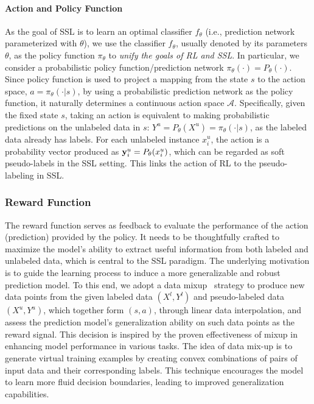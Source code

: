 \paragraph{Action and Policy Function}
As the goal of SSL is to learn an optimal classifier $f_\theta$ (i.e., prediction network parameterized with $\theta$), 
we use the classifier $f_\theta$, usually denoted by its parameters $\theta$, as the policy function $\pi_\theta$
to {\em unify the goals of RL and SSL}. 
In particular, we consider a probabilistic policy function/prediction network 
$\pi_\theta(\cdot)=P_\theta(\cdot)$. 
Since policy function is used to project a mapping from the state $s$ to the action space, 
$a=\pi_\theta(\cdot|s)$, 
by using a probabilistic prediction network as the policy function, 
it naturally determines a continuous action space $\mathcal{A}$.
Specifically, given the fixed state $s$, taking an action
is equivalent to making probabilistic predictions on the unlabeled data in $s$:
$Y^u=P_\theta(X^u)=\pi_\theta(\cdot|s)$, as the labeled data already has labels.  
For each unlabeled instance $x_i^u$, 
the action is a probability vector produced as ${\bf y}_i^u=P_\theta(x_i^u)$,
which can be regarded as soft pseudo-labels in the SSL setting.
This links the action of RL to the pseudo-labeling in SSL. 
\subsubsection{Reward Function}
The reward function serves as feedback to evaluate the performance of the action (prediction) provided by the policy. It needs to be thoughtfully crafted to maximize the model's ability to extract useful information from both labeled and unlabeled data, which is central to the SSL paradigm. 
The underlying motivation is to guide the learning process to induce a more generalizable and robust prediction model. 
To this end, we adopt a data mixup~\cite{zhang2018mixup}
 strategy to produce new data points 
from the given labeled data $(X^l,Y^l)$ and pseudo-labeled data $(X^u,Y^u)$,
which together form $(s,a)$,
through linear data interpolation,  
and assess the prediction model's generalization ability on such data points as the reward signal. 
This decision is inspired by the proven effectiveness of mixup in enhancing model performance in various tasks. 
The idea of data mix-up is to generate virtual training examples by creating convex combinations of pairs of input data and their corresponding labels. This technique encourages the model to learn more fluid decision boundaries, leading to improved generalization capabilities.


